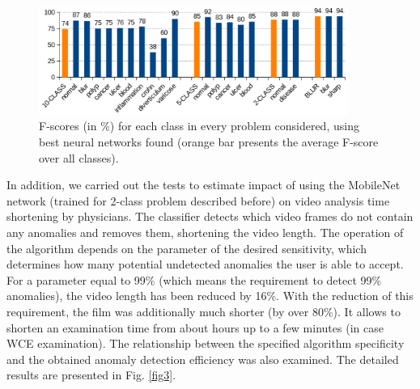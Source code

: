 \documentclass[preprint]{article}
\renewcommand{\onecolumn}{}
\renewcommand{\twocolumn}{}
\begin{document}
\begin{figure}[ht]
\centering
\includegraphics[width=0.9\textwidth]{fscore_labels.png}
\caption{F-scores (in \%) for each class in every problem considered, using best neural networks found (orange bar presents the average F-score over all classes).}
\label{fig2}
\end{figure}
\twocolumn



In addition, we carried out the tests to estimate impact of using the MobileNet network (trained for 2-class problem described before) on video analysis time shortening by physicians. The classifier detects which video frames do not contain any anomalies and removes them, shortening the video length. The operation of the algorithm depends on the parameter of the desired sensitivity, which determines how many potential undetected anomalies the user is able to accept. For a parameter equal to 99\% (which means the requirement to detect 99\% anomalies), the video length has been reduced by 16\%. With the reduction of this requirement, the film was additionally much shorter (by over 80\%). It allows to shorten an examination time from about hours up to a few minutes (in case WCE examination). The relationship between the specified algorithm specificity and the obtained anomaly detection efficiency was also examined. The detailed results are presented in Fig. \ref{fig3}.




\onecolumn
\end{document}
